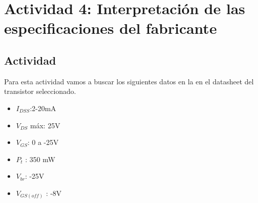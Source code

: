 \section{Actividad 4: Interpretación de las especificaciones del fabricante}

\subsection{Actividad}

Para esta actividad vamos a buscar los siguientes datos en la en el datasheet del transistor seleccionado.

\begin{itemize}
    \item $I_{DSS}$:2-20mA
    \item $V_{DS}$ máx: 25V
    \item $V_{GS}$: 0 a -25V
    \item $P_{t}$ : 350 mW
    \item $V_{br}$: -25V
    \item $V_{GS(off)}$ : -8V
\end{itemize}


